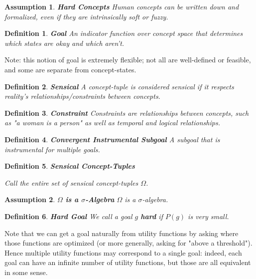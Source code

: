 \documentclass{article}
\newtheorem{definition}{Definition}
\newtheorem{assumption}{Assumption}
\begin{document}
\begin{assumption}{\textbf{Hard Concepts}}
    Human concepts can be written down and formalized, even if they are intrinsically soft or fuzzy.
\end{assumption}

\begin{definition}{\textbf{Goal}}
    An indicator function over concept space that determines which states are okay and which aren't.
\end{definition}

Note: this notion of goal is extremely flexible; not all are well-defined or feasible, and some are separate from concept-states.

\begin{definition}{\textbf{Sensical}}
    A concept-tuple is considered sensical if it respects reality's relationships/constraints between concepts.
\end{definition}

\begin{definition}{\textbf{Constraint}}
    Constraints are relationships between concepts, such as "a woman is a person" as well as temporal and logical relationships.
\end{definition}

\begin{definition}{\textbf{Convergent Instrumental Subgoal}}
    A subgoal that is instrumental for multiple goals.
\end{definition}

\begin{definition}{\textbf{Sensical Concept-Tuples}}
    
    Call the entire set of sensical concept-tuples $\Omega$.
\end{definition}

\begin{assumption}{\textbf{$\Omega$ is a $\sigma$-Algebra}}
    $\Omega$ is a $\sigma$-algebra.
\end{assumption}

\begin{definition}{\textbf{Hard Goal}}
    We call a goal $g$ \textbf{hard} if $P(g)$ is very small.
\end{definition}

Note that we can get a goal naturally from utility functions by asking where those functions are optimized (or more generally, asking for "above a threshold"). Hence multiple utility functions may correspond to a single goal: indeed, each goal can have an infinite number of utility functions, but those are all equivalent in some sense.
\end{document}
